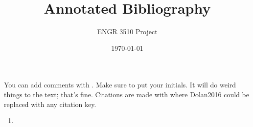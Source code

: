 \documentclass[12pt,letterpaper]{article}
\begin{document}
\title{Annotated Bibliography}
\author{ENGR 3510 Project}
\date{\today}
\maketitle


You can add comments with . Make sure to put your initials. It will do weird things to the text; that's fine. 
Citations are made with \cite{Dolan2016} where Dolan2016 could be replaced with any citation key. 


\begin{enumerate}
	\item \cite{Nan2013}
\end{enumerate}

\printbibliography
\end{document}
